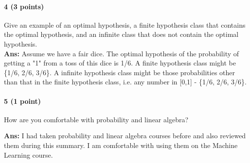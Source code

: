 \documentclass[11pt]{article}
\begin{document}
\paragraph{4 (3 points)} 
Give an example of an optimal hypothesis, a finite hypothesis class that contains the optimal hypothesis, and an infinite class that does not contain the optimal hypothesis.\\
\noindent
\textbf{Ans:} Assume we have a fair dice. The optimal hypothesis of the probability of getting a "1" from a toss of this dice is 1/6. A finite hypothesis class might be \{1/6, 2/6, 3/6\}. A infinite hypothesis class might be those probabilities other than that in the finite hypothesis class, i.e. any number in [0,1] - \{1/6, 2/6, 3/6\}.

\paragraph{5 (1 point)}
How are you comfortable with probability and linear algebra?

\noindent
\textbf{Ans:}
I had taken probability and linear algebra courses before and also reviewed them during this summary. I am comfortable with using them on the Machine Learning course.
\end{document}
